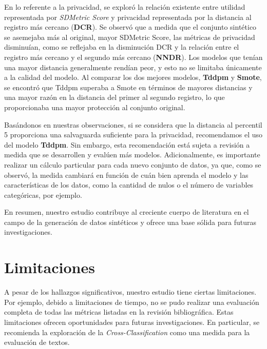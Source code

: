 En lo referente a la privacidad, se exploró la relación existente entre utilidad representada por \emph{SDMetric Score} y privacidad representada por la distancia al registro más cercano (\textbf{DCR}). Se observó que a medida que el conjunto sintético se asemejaba más al original, mayor SDMetric Score, las métricas de privacidad disminuían, como se reflejaba en la disminución DCR y la relación entre el registro más cercano y el segundo más cercano (\textbf{NNDR}). Los modelos que tenían una mayor distancia generalmente rendían peor, y esto no se limitaba únicamente a la calidad del modelo. Al comparar los dos mejores modelos, \textbf{Tddpm} y \textbf{Smote}, se encontró que Tddpm superaba a Smote en términos de mayores distancias y una mayor razón en la distancia del primer al segundo registro, lo que proporcionaba una mayor protección al conjunto original.

Basándonos en nuestras observaciones, si se considera que la distancia al percentil 5 proporciona una salvaguarda suficiente para la privacidad, recomendamos el uso del modelo \textbf{Tddpm}. Sin embargo, esta recomendación está sujeta a revisión a medida que se desarrollen y evalúen más modelos. Adicionalmente, es importante realizar un cálculo particular para cada nuevo conjunto de datos, ya que, como se observó, la medida cambiará en función de cuán bien aprenda el modelo y las características de los datos, como la cantidad de nulos o el número de variables categóricas, por ejemplo.



En resumen, nuestro estudio contribuye al creciente cuerpo de literatura en el campo de la generación de datos sintéticos y ofrece una base sólida para futuras investigaciones.


\section{Limitaciones}
\label{sec:limit}
A pesar de los hallazgos significativos, nuestro estudio tiene ciertas limitaciones. Por ejemplo, debido a limitaciones de tiempo, no se pudo realizar una evaluación completa de todas las métricas listadas en la revisión bibliográfica. Estas limitaciones ofrecen oportunidades para futuras investigaciones. En particular, se recomienda la exploración de la \emph{Cross-Classification} como una medida para la evaluación de textos.

